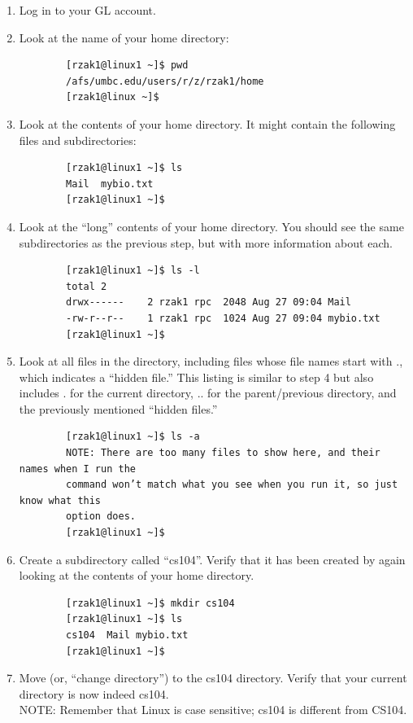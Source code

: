 \documentclass[letter,11pt]{article}
\begin{document}
\begin{enumerate}
    \item Log in to your GL account.
    \item Look at the name of your home directory:
    \begin{verbatim}
        [rzak1@linux1 ~]$ pwd
        /afs/umbc.edu/users/r/z/rzak1/home
        [rzak1@linux ~]$    
    \end{verbatim}
    \item Look at the contents of your home directory. It might contain the following files and subdirectories:
    \begin{verbatim}
        [rzak1@linux1 ~]$ ls
        Mail  mybio.txt
        [rzak1@linux1 ~]$
    \end{verbatim}
    \item Look at the ``long'' contents of your home directory. You should see the same subdirectories as the previous step, but with more information about each.
    \begin{verbatim}
        [rzak1@linux1 ~]$ ls -l
        total 2
        drwx------    2 rzak1 rpc  2048 Aug 27 09:04 Mail
        -rw-r--r--    1 rzak1 rpc  1024 Aug 27 09:04 mybio.txt
        [rzak1@linux1 ~]$
    \end{verbatim}
    \item Look at all files in the directory, including files whose file names start with ., which indicates a ``hidden file.'' This listing is similar to step 4 but also includes . for the current directory, .. for the parent/previous directory, and the previously mentioned ``hidden files.''
    \begin{verbatim}
        [rzak1@linux1 ~]$ ls -a
        NOTE: There are too many files to show here, and their names when I run the
        command won’t match what you see when you run it, so just know what this
        option does.
        [rzak1@linux1 ~]$
    \end{verbatim}
    \item Create a subdirectory called ``cs104''. Verify that it has been created by again looking at the contents of your home directory.
    \begin{verbatim}
        [rzak1@linux1 ~]$ mkdir cs104
        [rzak1@linux1 ~]$ ls
        cs104  Mail mybio.txt
        [rzak1@linux1 ~]$
    \end{verbatim}
    \item Move (or, ``change directory'') to the cs104 directory. Verify that your current directory is now indeed cs104. \\ NOTE: Remember that Linux is case sensitive; cs104 is different from CS104.

\end{enumerate}
\end{document}
